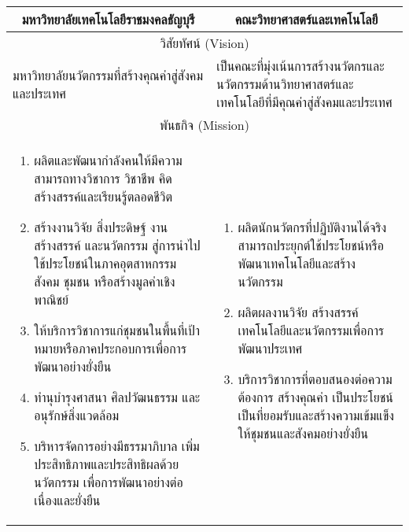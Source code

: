 


\begin{center}
\begin{tabular}{|p{}|p{}|}
\hline
\multicolumn{1}{|c|}{\textbf{มหาวิทยาลัยเทคโนโลยีราชมงคลธัญบุรี}} & \multicolumn{1}{|c|}{\textbf{คณะวิทยาศาสตร์และเทคโนโลยี}} \\
\hline
\multicolumn{2}{|c|}{วิสัยทัศน์ (Vision)} \\
\hline
มหาวิทยาลัยนวัตกรรมที่สร้างคุณค่าสู่สังคมและประเทศ & 
เป็นคณะที่มุ่งเน้นการสร้างนวัตกรและนวัตกรรมด้านวิทยาศาสตร์และเทคโนโลยีที่มีคุณค่าสู่สังคมและประเทศ  \\
\hline
\multicolumn{2}{|c|}{พันธกิจ (Mission)} \\
\hline
\begin{enumerate}
\item ผลิตและพัฒนากำลังคนให้มีความสามารถทางวิชาการ วิชาชีพ คิดสร้างสรรค์และเรียนรู้ตลอดชีวิต
\item สร้างงานวิจัย สิ่งประดิษฐ์ งานสร้างสรรค์ และนวัตกรรม สู่การนำไปใช้ประโยชน์ในภาคอุตสาหกรรม สังคม ชุมชน หรือสร้างมูลค่าเชิงพาณิชย์
\item ให้บริการวิชาการแก่ชุมชนในพื้นที่เป้าหมายหรือภาคประกอบการเพื่อการพัฒนาอย่างยั่งยืน
\item ทำนุบำรุงศาสนา ศิลปวัฒนธรรม และอนุรักษ์สิ่งแวดล้อม
\item บริหารจัดการอย่างมีธรรมาภิบาล เพิ่มประสิทธิภาพและประสิทธิผลด้วยนวัตกรรม เพื่อการพัฒนาอย่างต่อเนื่องและยั่งยืน
\end{enumerate}
&
\begin{enumerate}
\item ผลิตนักนวัตกรที่ปฏิบัติงานได้จริง สามารถประยุกต์ใช้ประโยชน์หรือพัฒนาเทคโนโลยีและสร้างนวัตกรรม
\item ผลิตผลงานวิจัย สร้างสรรค์เทคโนโลยีและนวัตกรรมเพื่อการพัฒนาประเทศ
\item บริการวิชาการที่ตอบสนองต่อความต้องการ สร้างคุณค่า เป็นประโยชน์ เป็นที่ยอมรับและสร้างความเข้มแข็งให้ชุมชนและสังคมอย่างยั่งยืน
\end{enumerate} \\
\hline
\end{tabular}
\end{center}

